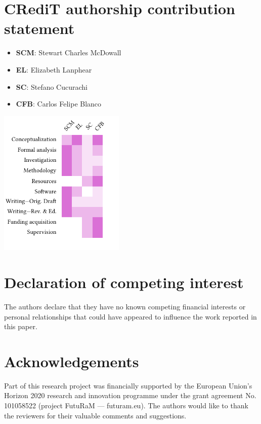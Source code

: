 \documentclass[review,3p,authoryear]{elsarticle}
\begin{document}
\section*{CRediT authorship contribution statement}

\begin{itemize}[noitemsep]
    \item \textbf{SCM}: Stewart Charles McDowall
    \item \textbf{EL}: Elizabeth Lanphear
    \item \textbf{SC}: Stefano Cucurachi
    \item \textbf{CFB}: Carlos Felipe Blanco
\end{itemize}

\includegraphics[width=\columnwidth, height=7cm, keepaspectratio]{credit.pdf}

\section*{Declaration of competing interest}
The authors declare that they have no known competing financial interests or personal relationships that could have appeared to influence the work reported in this paper.

\section*{Acknowledgements}
Part of this research project was financially supported by the European Union's Horizon 2020 research and innovation programme under the grant agreement No. 101058522 (project FutuRaM --- futuram.eu). The authors would like to thank the reviewers for their valuable comments and suggestions.
\end{document}

